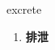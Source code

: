 
\begin{frame}
{\huge excrete}
\begin{center}
\begin{enumerate}\Large
  \item \textbf{排泄}
\end{enumerate}
\end{center}
\end{frame}
